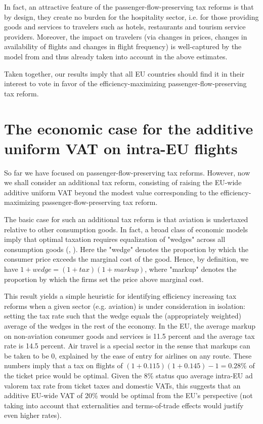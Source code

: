 \documentclass{article}
\begin{document}
In fact, an attractive feature of the passenger-flow-preserving tax reforms is that by design, they create no burden for the hospitality sector, i.e. for those providing goods and services to travelers such as hotels, restaurants and tourism service providers. Moreover, the impact on travelers (via changes in prices, changes in availability of flights and changes in flight frequency) is well-captured by the model from \citet{Dörpinghaus_et_al_2026} and thus already taken into account in the above estimates.

Taken together, our results imply that all EU countries should find it in their interest to vote in favor of the efficiency-maximizing passenger-flow-preserving tax reform.


\section{The economic case for the additive uniform VAT on intra-EU flights}

So far we have focused on passenger-flow-preserving tax reforms. However, now we shall consider an additional tax reform, consisting of raising the EU-wide additive uniform VAT beyond the modest value corresponding to the efficiency-maximizing passenger-flow-preserving tax reform.

The basic case for such an additional tax reform is that aviation is undertaxed relative to other consumption goods. In fact, a broad class of economic models imply that optimal taxation requires equalization of "wedges" across all consumption goods (\citet{atkinson1976design}, \citet{epifani2011trade}). Here the "wedge" denotes the proportion by which the consumer price exceeds the marginal cost of the good. Hence, by definition, we have $1+wedge=(1+tax)(1+markup)$, where "markup" denotes the proportion by which the firms set the price above marginal cost.

This result yields a simple heuristic for identifying efficiency increasing tax reforms when a given sector (e.g. aviation) is under consideration in isolation: setting the tax rate such that the wedge equals the (appropriately weighted) average of the wedges in the rest of the economy. In the EU, the average markup on non-aviation consumer goods and services is 11.5 percent and the average tax rate is 14.5 percent. Air travel is a special sector in the sense that markups can be taken to be 0, explained by the ease of entry for airlines on any route. These numbers imply that a tax on flights of $(1+0.115)(1+0.145)-1=0.28$\% %
of the ticket price would be optimal. Given the $8\%$ status quo average intra-EU ad valorem tax rate from ticket taxes and domestic VATs, this suggests that an additive EU-wide VAT of 20\% would be optimal from the EU's perspective (not taking into account that externalities and terms-of-trade effects 
would justify even higher rates). %
\end{document}
